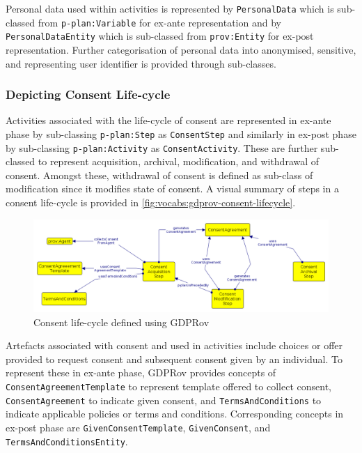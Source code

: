 Personal data used within activities is represented by \texttt{PersonalData} which is sub-classed from \texttt{p-plan:Variable} for ex-ante representation and by \texttt{PersonalDataEntity} which is sub-classed from \texttt{prov:Entity} for ex-post representation.
Further categorisation of personal data into anonymised, sensitive, and representing user identifier is provided through sub-classes.

\subsubsection{Depicting Consent Life-cycle}
Activities associated with the life-cycle of consent are represented in ex-ante phase by sub-classing \texttt{p-plan:Step} as \texttt{ConsentStep} and similarly in ex-post phase by sub-classing \texttt{p-plan:Activity} as \texttt{ConsentActivity}.
These are further sub-classed to represent acquisition, archival, modification, and withdrawal of consent.
Amongst these, withdrawal of consent is defined as sub-class of modification since it modifies state of consent.
A visual summary of steps in a consent life-cycle is provided in \autoref{fig:vocabs:gdprov-consent-lifecycle}.
\begin{figure}[htbp]
    \centering
    \includegraphics[width=\linewidth]{img/GDPRov_consent_lifecycle.png}
    \caption{Consent life-cycle defined using GDPRov}
    \label{fig:vocabs:gdprov-consent-lifecycle}
\end{figure}

Artefacts associated with consent and used in activities include choices or offer provided to request consent and subsequent consent given by an individual.
To represent these in ex-ante phase, GDPRov provides concepts of \texttt{ConsentAgreementTemplate} to represent template offered to collect consent, \texttt{ConsentAgreement} to indicate given consent, and \texttt{TermsAndConditions} to indicate applicable policies or terms and conditions.
Corresponding concepts in ex-post phase are \texttt{GivenConsentTemplate}, \texttt{GivenConsent}, and \texttt{TermsAndConditionsEntity}.

